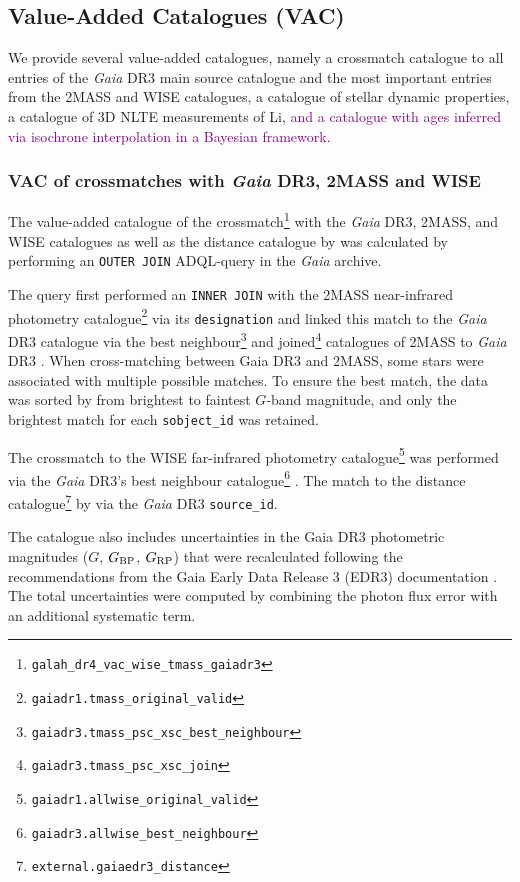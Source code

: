 \documentclass[
  journal=pasa,
  manuscript=research-paper, %
  year=2024,
  volume=37
]{cup-journal}
\newcommand{\SB}[1]{{\textcolor{purple}{#1}}}
\newcommand{\Gaia}{\textit{Gaia}\xspace}
\begin{document}
\subsection{Value-Added Catalogues (VAC)} \label{sec:vacs}

We provide several value-added catalogues, namely a crossmatch catalogue to all entries of the \Gaia DR3 main source catalogue and the most important entries from the 2MASS and WISE catalogues, a catalogue of stellar dynamic properties, a catalogue of 3D NLTE measurements of Li, \SB{and a catalogue with ages inferred via isochrone interpolation in a Bayesian framework}.

\subsubsection{VAC of crossmatches with \Gaia DR3, 2MASS and WISE} \label{sec:vac_crossmatch}

The value-added catalogue of the crossmatch\footnote{\texttt{galah\_dr4\_vac\_wise\_tmass\_gaiadr3}} with the \Gaia DR3, 2MASS, and WISE catalogues as well as the distance catalogue by \citet{BailerJones2021} was calculated by performing an \texttt{OUTER JOIN} ADQL-query in the \Gaia archive. 

The query first performed an \texttt{INNER JOIN} with the 2MASS near-infrared photometry catalogue\footnote{\texttt{gaiadr1.tmass\_original\_valid}} \citep{Skrutskie2006} via its \texttt{designation} and linked this match to the \Gaia DR3 catalogue via the best neighbour\footnote{ \texttt{gaiadr3.tmass\_psc\_xsc\_best\_neighbour}} and joined\footnote{\texttt{gaiadr3.tmass\_psc\_xsc\_join}} catalogues of 2MASS to \Gaia DR3 \citep{Torra2021}. When cross-matching between Gaia DR3 and 2MASS, some stars were associated with multiple possible matches. To ensure the best match, the data was sorted by from brightest to faintest \(G\)-band magnitude, and only the brightest match for each \texttt{sobject\_id} was retained.

The crossmatch to the WISE far-infrared photometry catalogue\footnote{\texttt{gaiadr1.allwise\_original\_valid}} \citep{Cutri2013} was performed via the \Gaia DR3's best neighbour catalogue\footnote{\texttt{gaiadr3.allwise\_best\_neighbour}} \citep{Torra2021}. The match to the distance catalogue\footnote{\texttt{external.gaiaedr3\_distance}} by \citet{BailerJones2021}  via the \Gaia DR3 \texttt{source\_id}.

The catalogue also includes uncertainties in the Gaia DR3 photometric magnitudes (\(G\), \(G_{\rm BP}\), \(G_{\rm RP}\)) that were recalculated following the recommendations from the Gaia Early Data Release 3 (EDR3) documentation \citep{Riello2021}. The total uncertainties were computed by combining the photon flux error with an additional systematic term.
\end{document}

